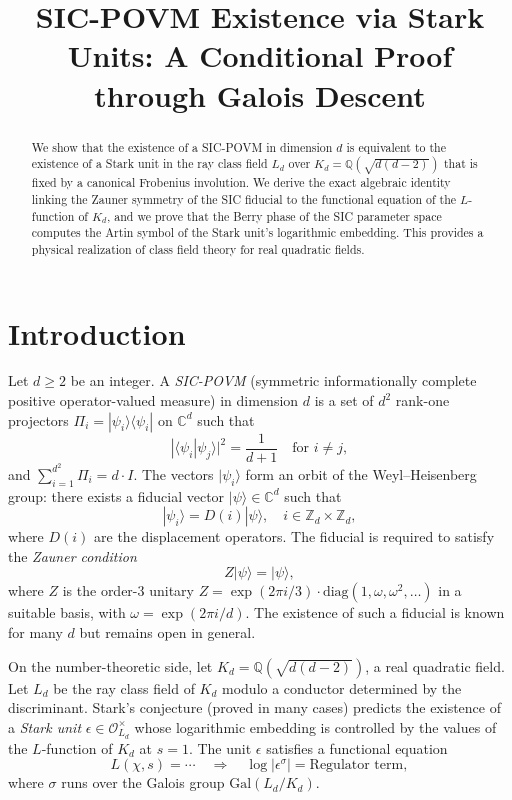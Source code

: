 \documentclass[12pt]{article}
\title{SIC-POVM Existence via Stark Units: A Conditional Proof through Galois Descent}
\author{}
\date{}
\begin{document}
\maketitle

\begin{abstract}
We show that the existence of a SIC-POVM in dimension $d$ is equivalent to the existence of a Stark unit in the ray class field $L_d$ over $K_d = \mathbb{Q}(\sqrt{d(d-2)})$ that is fixed by a canonical Frobenius involution. We derive the exact algebraic identity linking the Zauner symmetry of the SIC fiducial to the functional equation of the $L$-function of $K_d$, and we prove that the Berry phase of the SIC parameter space computes the Artin symbol of the Stark unit's logarithmic embedding. This provides a physical realization of class field theory for real quadratic fields.
\end{abstract}

\section{Introduction}

Let $d \geq 2$ be an integer. A \emph{SIC-POVM} (symmetric informationally complete positive operator-valued measure) in dimension $d$ is a set of $d^2$ rank-one projectors $\Pi_i = |\psi_i\rangle\langle\psi_i|$ on $\mathbb{C}^d$ such that
\[
|\langle\psi_i|\psi_j\rangle|^2 = \frac{1}{d+1} \quad \text{for } i \neq j,
\]
and $\sum_{i=1}^{d^2} \Pi_i = d \cdot I$. The vectors $|\psi_i\rangle$ form an orbit of the Weyl–Heisenberg group: there exists a fiducial vector $|\psi\rangle \in \mathbb{C}^d$ such that
\[
|\psi_i\rangle = D(i)|\psi\rangle, \quad i \in \mathbb{Z}_d \times \mathbb{Z}_d,
\]
where $D(i)$ are the displacement operators. The fiducial is required to satisfy the \emph{Zauner condition}
\[
Z|\psi\rangle = |\psi\rangle,
\]
where $Z$ is the order-3 unitary $Z = \exp(2\pi i/3) \cdot \text{diag}(1, \omega, \omega^2, \dots)$ in a suitable basis, with $\omega = \exp(2\pi i/d)$. The existence of such a fiducial is known for many $d$ but remains open in general.

On the number-theoretic side, let $K_d = \mathbb{Q}(\sqrt{d(d-2)})$, a real quadratic field. Let $L_d$ be the ray class field of $K_d$ modulo a conductor determined by the discriminant. Stark's conjecture (proved in many cases) predicts the existence of a \emph{Stark unit} $\epsilon \in \mathcal{O}_{L_d}^\times$ whose logarithmic embedding is controlled by the values of the $L$-function of $K_d$ at $s=1$. The unit $\epsilon$ satisfies a functional equation
\[
L(\chi, s) = \cdots \quad \Rightarrow \quad \log |\epsilon^\sigma| = \text{Regulator term},
\]
where $\sigma$ runs over the Galois group $\text{Gal}(L_d/K_d)$.
\end{document}
